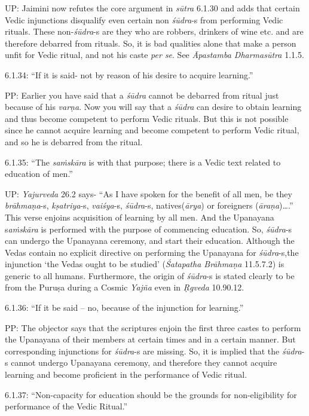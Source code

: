 UP: Jaimini now refutes the core argument in \textit{sūtra} 6.1.30 and adds that certain Vedic injunctions disqualify even certain non \textit{śūdra}-s from performing Vedic rituals. These non-\textit{śūdra}-s are they who are robbers, drinkers of wine etc. and are therefore debarred from rituals. So, it is bad qualities alone that make a person unfit for Vedic ritual, and not his caste \textit{per se}. See \textit{Āpastamba Dharmasūtra} 1.1.5.

6.1.34: “If it is said- not by reason of his desire to acquire learning.”

PP: Earlier you have said that a \textit{śūdra} cannot be debarred from ritual just because of his \textit{varṇa}. Now you will say that a \textit{śūdra} can desire to obtain learning and thus become competent to perform Vedic rituals. But this is not possible since he cannot acquire learning and become competent to perform Vedic ritual, and so he is debarred from the ritual.

6.1.35: “The \textit{saṁskāra} is with that purpose; there is a Vedic text related to education of men.”

UP: \textit{Yajurveda} 26.2 says- “As I have spoken for the benefit of all men, be they \textit{brāhmaṇa}-s, \textit{kṣatriya}-s, \textit{vaiśya}-s, \textit{śūdra}-s, natives(\textit{ārya}) or foreigners (\textit{āraṇa})….” This verse enjoins acquisition of learning by all men. And the Upanayana s\textit{aṁskāra} is performed with the purpose of commencing education. So, \textit{śūdra}-s can undergo the Upanayana ceremony, and start their education. Although the Vedas contain no explicit directive on performing the Upanayana for \textit{śūdra}-s,\break the injunction ‘the Vedas ought to be studied’ (\textit{Śatapatha Brāhmaṇa} 11.5.7.2) is generic to all humans. Furthermore, the origin of \textit{śūdra}-s is stated clearly to be from the Puruṣa during a Cosmic \textit{Yajña} even in \textit{Ṛgveda} 10.90.12.

6.1.36: “If it be said – no, because of the injunction for learning.”

PP: The objector says that the scriptures enjoin the first three castes to perform the Upanayana of their members at certain times and in a certain manner. But corresponding injunctions for \textit{śūdra}-s are missing. So, it is implied that the \textit{śūdra}-s cannot undergo Upanayana ceremony, and therefore they cannot acquire learning and become proficient in the performance of Vedic ritual.

6.1.37: “Non-capacity for education should be the grounds for non-eligibility for performance of the Vedic Ritual.”

